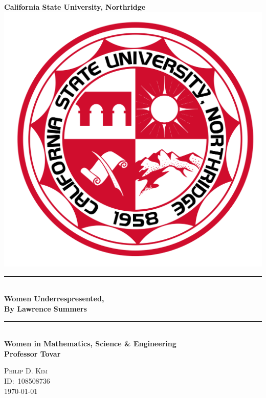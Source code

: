\begin{titlepage}
  \newcommand{\HRule}{\rule{\linewidth}{0.5mm}}
  \center\Huge\textbf{California State University, Northridge}\\[2cm]
  \includegraphics[scale=0.2]{CSUNS.svg.png}\\[1cm]
  \HRule\  \\[0.4cm]
  {\huge\bfseries Women Underrespresented,\\By Lawrence Summers}\\[0.4cm]
  \HRule\  \\[1.4cm]
  \Large\textbf{Women in Mathematics, Science \& Engineering}\\[0.5cm]
  \large\textbf{Professor Tovar}
  \vfill
  \begin{minipage}{0.4\textwidth}
  \large\centering\textsc{Philip D. Kim}\\
  \textsc{ID:\ 108508736}\\
  \textsc{\today}
  \end{minipage}
\end{titlepage}
